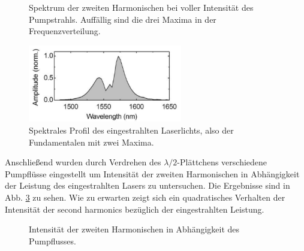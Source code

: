 \pgfplotsset{width=0.6\textwidth,height=4cm,scale only axis=true}
\begin{figure}
  \centering
  \caption{Spektrum der zweiten Harmonischen bei voller Intensität des Pumpstrahls. Auffällig sind die drei Maxima in der Frequenzverteilung.}
  \label{shg_spektrum}
\end{figure}



\begin{figure}[H]
	\begin{center}
		\includegraphics[width=0.6\textwidth]{Abb/laserprofil.png}
		\caption{Spektrales Profil des eingestrahlten Laserlichts, also der Fundamentalen mit zwei Maxima.}
		\label{laserprofil}
	\end{center}
\end{figure}

Anschließend wurden durch Verdrehen des $\lambda/2$-Plättchens verschiedene Pumpflüsse eingestellt um Intensität der zweiten Harmonischen in Abhängigkeit der Leistung des eingestrahlten Lasers zu untersuchen. Die Ergebnisse sind in Abb. \ref{intensitätmod} zu sehen. Wie zu erwarten zeigt sich ein quadratisches Verhalten der Intensität der second harmonics bezüglich der eingestrahlten Leistung.

\begin{figure}
  \centering
  \caption{Intensität der zweiten Harmonischen in Abhängigkeit des Pumpflusses.}
  \label{intensitätmod}
\end{figure}

